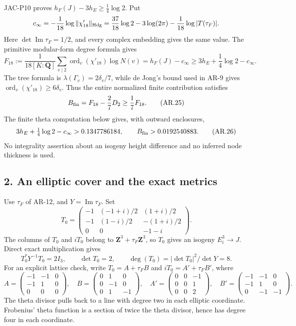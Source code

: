 JAC-P10 proves \(h_F(J)-3h_E\ge\frac14\log2\). Put \[
c_\infty=-\frac1{18}\log\|\chi'_{18}\|_{\rm Hdg}
 =\frac{37}{18}\log2-3\log(2\pi)-\frac1{18}\log|T(\tau_F)|.
\] Here \(\det\operatorname{Im}\tau_F=1/2\), and every complex embedding
gives the same value. The primitive modular-form degree formula gives \[
F_{18}:=\frac1{18[K:\mathbf Q]}
 \sum_{v\mid2}\operatorname{ord}_v(\chi'_{18})\log N(v)
 =h_F(J)-c_\infty
 \ge3h_E+\frac14\log2-c_\infty.
\tag{AR.24}
\] The tree formula is \(\lambda(\Gamma_v)=2\delta_v/7\), while de
Jong's bound used in AR-9 gives
\(\operatorname{ord}_v(\chi'_{18})\ge6\delta_v\). Thus the entire
normalized finite contribution satisfies \[
B_{\rm fin}=F_{18}-\frac27D_2\ge\frac17F_{18}.
\tag{AR.25}
\] The finite theta computation below gives, with outward enclosures, \[
3h_E+\tfrac14\log2-c_\infty>0.1347786184,
\qquad B_{\rm fin}>0.0192540883.
\tag{AR.26}
\] No integrality assertion about an isogeny height difference and no
inferred node thickness is used.

\subsection{2. An elliptic cover and the exact
metrics}\label{an-elliptic-cover-and-the-exact-metrics}

Use \(\tau_F\) of AR-12, and \(Y=\operatorname{Im}\tau_F\). Set \[
T_0=
\begin{pmatrix}
-1&(-1+i)/2&(1+i)/2\\
-1&(1-i)/2&-(1+i)/2\\
0&0&-1-i
\end{pmatrix}.
\] The columns of \(T_0\) and \(iT_0\) belong to
\(\mathbf Z^3+\tau_F\mathbf Z^3\), so \(T_0\) gives an isogeny
\(E_i^3\to J\). Direct exact multiplication gives \[
T_0^*Y^{-1}T_0=2I_3,\qquad \det T_0=2,
\qquad\deg(T_0)=|\det T_0|^2/\det Y=8.
\] For an explicit lattice check, write \(T_0=A+\tau_F B\) and
\(iT_0=A'+\tau_F B'\), where \[
A=\begin{pmatrix}-1&-1&0\\-1&1&0\\0&0&0\end{pmatrix},
\quad
B=\begin{pmatrix}0&1&0\\0&-1&0\\0&1&-1\end{pmatrix},
\quad
A'=\begin{pmatrix}0&0&-1\\0&0&1\\0&0&2\end{pmatrix},
\quad
B'=\begin{pmatrix}-1&-1&0\\-1&1&0\\0&-1&-1\end{pmatrix}.
\] The theta divisor pulls back to a line with degree two in each
elliptic coordinate. Frobenius' theta function is a section of twice the
theta divisor, hence has degree four in each coordinate.

